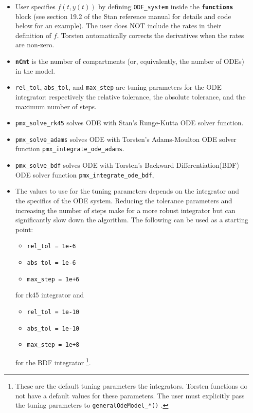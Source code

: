 \documentclass[11pt, reqno, oneside]{amsbook}
\numberwithin{equation}{chapter}
\numberwithin{figure}{chapter}
\numberwithin{table}{chapter}
\theoremstyle{remark}
\begin{document}
\begin{itemize}
\item User specifies \(f(t, y(t))\) by defining \texttt{ODE\_system}
inside the {\small \color{MRGGreen} \texttt{\textbf{functions}}} block (see section 19.2 of the
Stan reference manual for details and code below
for an example). The user does NOT include the rates in their
definition of \(f\). Torsten automatically corrects the derivatives when
the rates are non-zero.
\item {\small \color{MRGGreen} \texttt{\textbf{nCmt}}} is the number of compartments (or, equivalently, the
number of ODEs) in the model.
\item \texttt{rel\_tol}, \texttt{abs\_tol},
and \texttt{max\_step} are tuning parameters for the ODE integrator:
respectively the relative tolerance, the absolute tolerance, and the
maximum number of steps.
\item \texttt{pmx\_solve\_rk45} solves ODE with Stan's Runge-Kutta
ODE solver function.
\item \texttt{pmx\_solve\_adams} solves ODE with Torsten's Adams-Moulton ODE solver function \texttt{pmx\_integrate\_ode\_adams}.
\item \texttt{pmx\_solve\_bdf} solves ODE with Torsten's Backward
Differentiation(BDF) ODE solver function \texttt{pmx\_integrate\_ode\_bdf},
\item The values to use for the tuning parameters depends on the integrator and
the specifics of the ODE system. Reducing the tolerance parameters and
increasing the number of steps make for a more robust integrator but
can significantly slow down the algorithm. The following can be used
as a starting point: 
\begin{itemize}
\item \texttt{rel\_tol = 1e-6}
\item \texttt{abs\_tol = 1e-6}
\item \texttt{max\_step = 1e+6}
\end{itemize}
for rk45 integrator and
\begin{itemize}
\item \texttt{rel\_tol = 1e-10}
\item \texttt{abs\_tol = 1e-10}
\item \texttt{max\_step = 1e+8}
\end{itemize}
for the BDF integrator \footnote{These are the default tuning parameters the integrators. Torsten functions do not have a default values for these parameters. The user must explicitly pass the tuning parameters to \texttt{generalOdeModel\_*()} .}.

\end{itemize}
\end{document}

